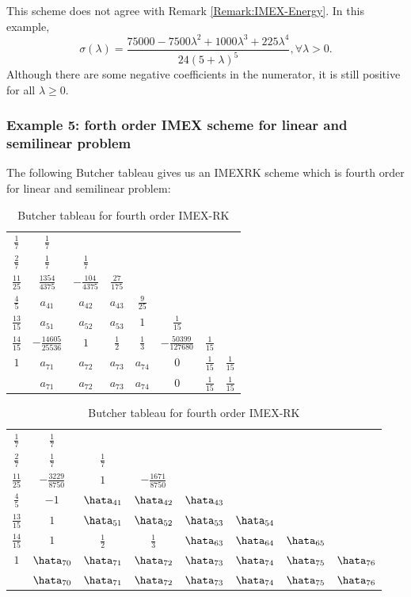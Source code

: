 This scheme does not agree with Remark \ref{Remark:IMEX-Energy}. 
 In this example,
 $$\sigma(\lambda) = \frac{75000-7500 \lambda^2 +1000\lambda^3 +225 \lambda^4}
 {24(5+\lambda)^5}, \forall \lambda > 0.$$
Although there are some negative coefficients in the numerator, it is still positive for all $\lambda \geq 0$.

\subsubsection{Example 5: forth order IMEX scheme for linear and semilinear problem}

 The following Butcher tableau gives us an IMEXRK scheme 
 which is fourth order for linear and semilinear problem:
 \linespread{1.5}
 \begin{table}[h] \label{Tab:IMEX47}
     \centering
     \begin{tabular}[h]{c|ccccccc}
         $\frac{1}{7}$ & $\frac{1}{7}$ \\
         $\frac{2}{7}$ & $\frac{1}{7}$&$\frac{1}{7}$\\
         $\frac{11}{25}$ & $\frac{1354}{4375}$&$-\frac{104}{4375}$&$\frac{27}{175}$\\
         $\frac{4}{5}$ & $a_{41}$&$a_{42}$&$a_{43}$&$\frac{9}{25}$\\
         $\frac{13}{15}$ & $a_{51}$&$a_{52}$&$a_{53}$&$1$& $\frac{1}{15}$\\
         $\frac{14}{15}$ & $-\frac{14605}{25536}$&$1$&$\frac{1}{2}$&$\frac{1}{3}$&$-\frac{50399}{127680}$&$\frac{1}{15}$\\
         $1$&$a_{71}$&$a_{72}$&$a_{73}$&$a_{74}$&$0$& $\frac{1}{15}$& $\frac{1}{15}$\\
\hline
        ~&$a_{71}$&$a_{72}$&$a_{73}$&$a_{74}$&$0$& $\frac{1}{15}$& $\frac{1}{15}$\\
     \end{tabular}
     \begin{tabular}[h]{c|ccccccc}
        $\frac{1}{7}$ & $\frac{1}{7}$ \\
        $\frac{2}{7}$ & $\frac{1}{7}$&$\frac{1}{7}$\\
        $\frac{11}{25}$ & $-\frac{3229}{8750}$&$1$&$-\frac{1671}{8750}$\\
        $\frac{4}{5}$  & $-1$ & $\hata_{41}$&$\hata_{42}$&$\hata_{43}$\\
        $\frac{13}{15}$ & $1$ & $\hata_{51}$&$\hata_{52}$&$\hata_{53}$&$\hata_{54}$\\
        $\frac{14}{15}$ & $1$ & $\frac12$&$\frac13$&$\hata_{63}$&$\hata_{64}$&$\hata_{65}$\\
        $1$&$\hata_{70}$&$\hata_{71}$&$\hata_{72}$&$\hata_{73}$&$\hata_{74}$&$\hata_{75}$& $\hata_{76}$\\
\hline
~&$\hata_{70}$&$\hata_{71}$&$\hata_{72}$&$\hata_{73}$&$\hata_{74}$&$\hata_{75}$& $\hata_{76}$\\
\end{tabular}
     \caption{{Butcher tableau for fourth order IMEX-RK}}
 \end{table}
